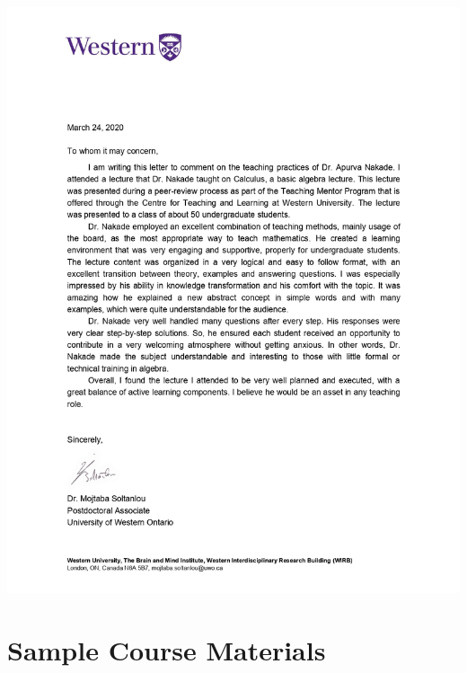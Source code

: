 \documentclass[
]{report}
\begin{document}
\includegraphics{images/2020 UWO CTL Teaching Mentor Program_page-0003.jpg}

\hypertarget{sample-course-materials}{%
\chapter{Sample Course Materials}\label{sample-course-materials}}
\end{document}
